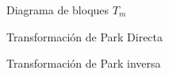\documentclass[a4paper, 10pt, onecolumn,journal]{ieeeconf}
\begin{document}
\begin{figure}[thpb]
    \centering
    \begin{adjustbox}{max width=\columnwidth}
    \end{adjustbox}
    \caption{Diagrama de bloques $T_m$}
    \label{diagrama de bloques T_m}
\end{figure}

\begin{figure}[thpb]
    \centering
    \begin{adjustbox}{max width=\columnwidth}
    \end{adjustbox}
    \caption{Transformación de Park Directa}
    \label{transformacion de Park}
\end{figure}

\begin{figure}[thpb]
    \centering
    \begin{adjustbox}{max width=\columnwidth}
    \end{adjustbox}
    \caption{Transformación de Park inversa}
    \label{transformacion de Park inversa}
\end{figure}

\end{document}
